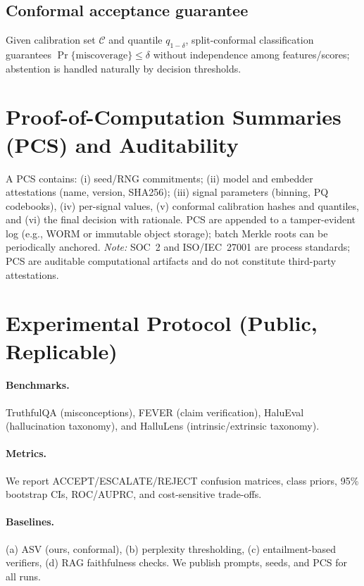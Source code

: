 \documentclass[11pt]{article}
\begin{document}
\subsection{Conformal acceptance guarantee}
Given calibration set $\mathcal{C}$ and quantile $q_{1-\delta}$, split-conformal classification guarantees $\Pr\{\text{miscoverage}\}\le\delta$ without independence among features/scores; abstention is handled naturally by decision thresholds.

\section{Proof-of-Computation Summaries (PCS) and Auditability}
A PCS contains: (i) seed/RNG commitments; (ii) model and embedder attestations (name, version, SHA256); (iii) signal parameters (binning, PQ codebooks), (iv) per-signal values, (v) conformal calibration hashes and quantiles, and (vi) the final decision with rationale. PCS are appended to a tamper-evident log (e.g., WORM or immutable object storage); batch Merkle roots can be periodically anchored. \emph{Note:} SOC~2 and ISO/IEC~27001 are process standards; PCS are auditable computational artifacts and do not constitute third-party attestations.

\section{Experimental Protocol (Public, Replicable)}
\paragraph{Benchmarks.} TruthfulQA (misconceptions), FEVER (claim verification), HaluEval (hallucination taxonomy), and HalluLens (intrinsic/extrinsic taxonomy).
\paragraph{Metrics.} We report \textsc{ACCEPT}/\textsc{ESCALATE}/\textsc{REJECT} confusion matrices, class priors, 95\% bootstrap CIs, ROC/AUPRC, and cost-sensitive trade-offs.
\paragraph{Baselines.} (a) ASV (ours, conformal), (b) perplexity thresholding, (c) entailment-based verifiers, (d) RAG faithfulness checks. We publish prompts, seeds, and PCS for all runs.
\end{document}
